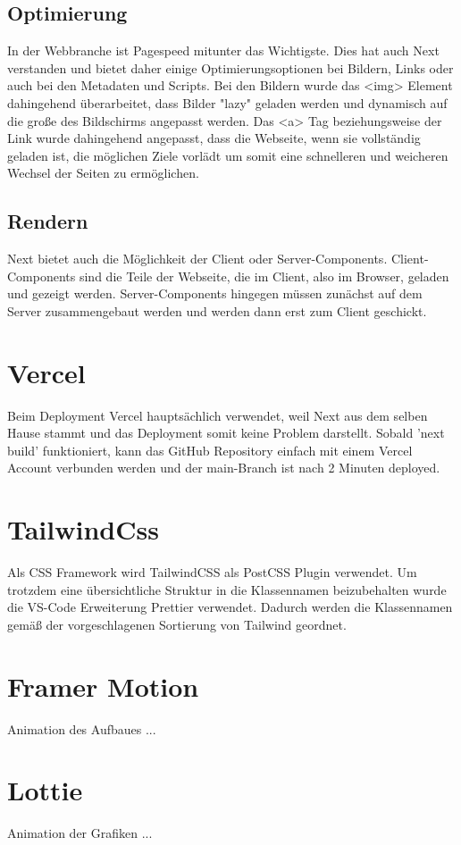 \subsection{Optimierung}
In der Webbranche ist Pagespeed mitunter das Wichtigste. Dies hat auch Next verstanden und bietet daher einige Optimierungsoptionen bei Bildern, Links oder auch bei den Metadaten und Scripts. 
Bei den Bildern wurde das <img> Element dahingehend überarbeitet, dass Bilder "lazy" geladen werden und dynamisch auf die große des Bildschirms angepasst werden. 
Das <a> Tag beziehungsweise der Link wurde dahingehend angepasst, dass die Webseite, wenn sie vollständig geladen ist, die möglichen Ziele vorlädt um somit eine schnelleren und weicheren Wechsel der Seiten zu ermöglichen.

\subsection{Rendern}
Next bietet auch die Möglichkeit der Client oder Server-Components. Client-Components sind die Teile der Webseite, die im Client, also im Browser, geladen und gezeigt werden.
Server-Components hingegen müssen zunächst auf dem Server zusammengebaut werden und werden dann erst zum Client geschickt.

\section{Vercel}
Beim Deployment Vercel hauptsächlich verwendet, weil Next aus dem selben Hause stammt und das Deployment somit keine Problem darstellt.
Sobald 'next build' funktioniert, kann das GitHub Repository einfach mit einem Vercel Account verbunden werden und der main-Branch ist nach 2 Minuten deployed. 

\section{TailwindCss}
Als CSS Framework wird TailwindCSS als PostCSS Plugin verwendet. 
Um trotzdem eine übersichtliche Struktur in die Klassennamen beizubehalten wurde die VS-Code Erweiterung Prettier verwendet. 
Dadurch werden die Klassennamen gemäß der vorgeschlagenen Sortierung von Tailwind geordnet.



\section{Framer Motion}
Animation des Aufbaues ...

\section{Lottie}
Animation der Grafiken ...


